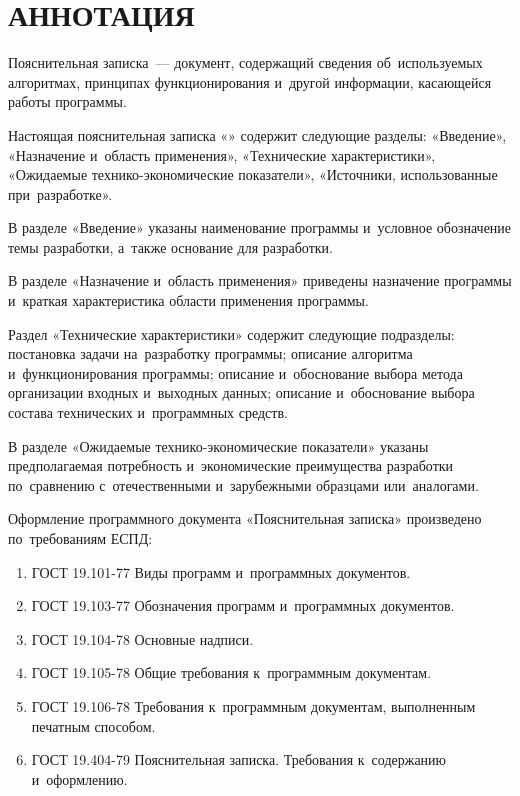 \documentclass[12pt,a4paper]{extarticle}
\begin{document}
\sloppy



\section*{АННОТАЦИЯ}

Пояснительная записка~--- документ, содержащий сведения об~используемых алгоритмах, принципах функционирования и~другой информации, касающейся работы программы.

Настоящая пояснительная записка «\hseProjectName» содержит следующие разделы: «Введение», «Назначение и~область применения», «Технические характеристики», «Ожидаемые технико-экономические показатели», «Источники, использованные при~разработке».

В разделе «Введение» указаны наименование программы и~условное обозначение темы разработки, а~также основание для разработки.

В разделе «Назначение и~область применения» приведены назначение программы и~краткая характеристика области применения программы.

Раздел «Технические характеристики» содержит следующие подразделы: постановка задачи на~разработку программы; описание алгоритма и~функционирования программы; описание и~обоснование выбора метода организации входных и~выходных данных; описание и~обоснование выбора состава технических и~программных средств.

В разделе «Ожидаемые технико-экономические показатели» указаны предполагаемая потребность и~экономические преимущества разработки по~сравнению с~отечественными и~зарубежными образцами или~аналогами.

\clearpage

\noindent
Оформление программного документа «Пояснительная записка» произведено по~требованиям ЕСПД:

\begin{enumerate}[label=\arabic*), leftmargin=1.25cm]
\item ГОСТ 19.101-77 Виды программ и~программных документов\cite{gost19101}.
\item ГОСТ 19.103-77 Обозначения программ и~программных документов\cite{gost19103}.
\item ГОСТ 19.104-78 Основные надписи\cite{gost19104}.
\item ГОСТ 19.105-78 Общие требования к~программным документам\cite{gost19105}.
\item ГОСТ 19.106-78 Требования к~программным документам, выполненным печатным способом\cite{gost19106}.
\item ГОСТ 19.404-79 Пояснительная записка. Требования к~содержанию и~оформлению\cite{gost19404}.
\end{enumerate}
\end{document}
